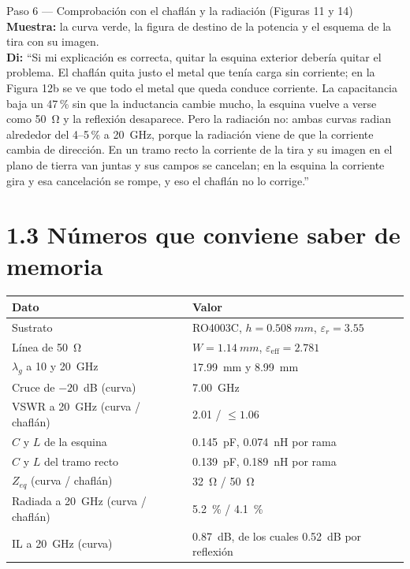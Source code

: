 \documentclass[11pt,letterpaper]{article}
\begin{document}
\begin{paso}{Paso 6 --- Comprobación con el chaflán y la radiación (Figuras 11 y 14)}
\textbf{Muestra:} la curva verde, la figura de destino de la potencia y el esquema de la tira con su imagen.\\
\textbf{Di:} ``Si mi explicación es correcta, quitar la esquina exterior debería quitar el problema. El chaflán quita justo el metal que tenía carga sin corriente; en la Figura 12b se ve que todo el metal que queda conduce corriente. La capacitancia baja un 47\,\% sin que la inductancia cambie mucho, la esquina vuelve a verse como \SI{50}{\ohm} y la reflexión desaparece. Pero la radiación no: ambas curvas radian alrededor del 4--5\,\% a \SI{20}{GHz}, porque la radiación viene de que la corriente cambia de dirección. En un tramo recto la corriente de la tira y su imagen en el plano de tierra van juntas y sus campos se cancelan; en la esquina la corriente gira y esa cancelación se rompe, y eso el chaflán no lo corrige.''
\end{paso}

\section*{1.3 Números que conviene saber de memoria}
\begin{center}
\small
\begin{tabular}{ll}
\toprule
Dato & Valor \\
\midrule
Sustrato & RO4003C, $h=\SI{0.508}{mm}$, $\varepsilon_r=3.55$ \\
Línea de \SI{50}{\ohm} & $W=\SI{1.14}{mm}$, $\varepsilon_{\mathrm{eff}}=2.781$ \\
$\lambda_g$ a 10 y \SI{20}{GHz} & \SI{17.99}{mm} y \SI{8.99}{mm} \\
Cruce de $-20$~dB (curva) & \SI{7.00}{GHz} \\
VSWR a \SI{20}{GHz} (curva / chaflán) & 2.01 / $\leq 1.06$ \\
$C$ y $L$ de la esquina & \SI{0.145}{pF}, \SI{0.074}{nH} por rama \\
$C$ y $L$ del tramo recto & \SI{0.139}{pF}, \SI{0.189}{nH} por rama \\
$Z_{eq}$ (curva / chaflán) & \SI{32}{\ohm} / \SI{50}{\ohm} \\
Radiada a \SI{20}{GHz} (curva / chaflán) & \SI{5.2}{\percent} / \SI{4.1}{\percent} \\
IL a \SI{20}{GHz} (curva) & \SI{0.87}{dB}, de los cuales \SI{0.52}{dB} por reflexión \\
\bottomrule
\end{tabular}
\end{center}
\end{document}

